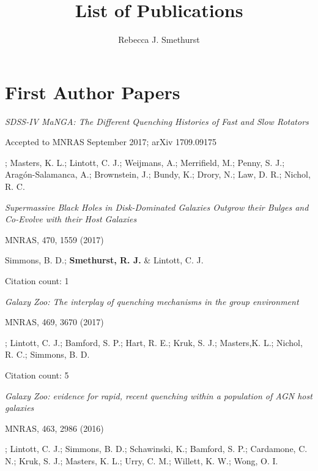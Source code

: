 \documentclass{article}
\begin{document}
\title{List of Publications}
\author{Rebecca J. Smethurst}


\maketitle

\section*{First Author Papers}

\hangindent=15pt \indent \indent \emph{SDSS-IV MaNGA: The Different Quenching Histories of Fast and Slow Rotators}

\indent \indent Accepted to MNRAS September 2017; arXiv 1709.09175

\hangindent=30pt \indent {}; Masters, K. L.; Lintott, C. J.; Weijmans, A.; Merrifield, M.; Penny, S. J.;  Arag\'on-Salamanca, A.; Brownstein, J.; Bundy, K.; Drory, N.; Law, D. R.; Nichol, R. C. 



\medskip

\hangindent=15pt \indent \emph{Supermassive Black Holes in Disk-Dominated Galaxies Outgrow their Bulges and Co-Evolve with their Host Galaxies}

\indent \indent MNRAS, 470, 1559 (2017)

\indent \indent Simmons, B. D.; {\bf Smethurst, R. J.} \& Lintott, C. J.

\indent \indent Citation count: 1


\medskip


\hangindent=15pt \indent \emph{Galaxy Zoo: The interplay of quenching mechanisms in the group environment}

\indent \indent MNRAS, 469, 3670 (2017)

\hangindent=30pt \indent {}; Lintott, C. J.; Bamford, S. P.; Hart, R. E.; Kruk, S. J.; Masters,K. L.; Nichol, R. C.; Simmons, B. D.


\indent \indent Citation count: 5

\medskip

\hangindent=15pt \indent \emph{Galaxy Zoo: evidence for rapid, recent quenching within a population of AGN host galaxies}

\indent \indent MNRAS, 463, 2986 (2016)

\hangindent=30pt \indent {}; Lintott, C. J.; Simmons, B. D.; Schawinski, K.; Bamford, S. P.; Cardamone, C. N.; Kruk, S. J.; Masters, K. L.; Urry, C. M.; Willett, K. W.; Wong, O. I.
\end{document}
